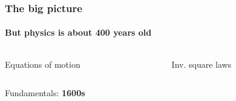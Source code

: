{
\DarkMode
\begin{frame}
    \frametitle{The big picture}
    \framesubtitle{But physics is about 400 years old}

    \begin{columns}
        \begin{column}{0.5\textwidth}
        \begin{center}
            \tiny{Equations of motion}
        \end{center}
        \end{column}
        \begin{column}{0.5\textwidth}
        \begin{center}
            \tiny{Inv. square laws}
        \end{center}
        \end{column}
    \end{columns}

    \begin{columns}
        \begin{column}{0.5\textwidth}
        \end{column}
        \begin{column}{0.5\textwidth}
        \end{column}
    \end{columns}

\begin{center}
    Fundamentals: \textbf{1600s}
\end{center}
\end{frame}
}

